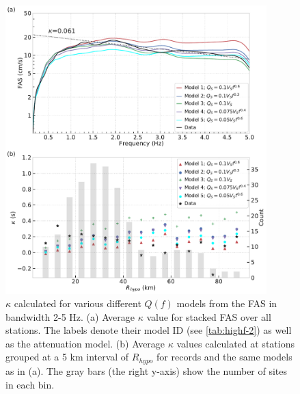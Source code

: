 \begin{figure}[!ht]
  \centering
  \includegraphics[width=0.9\textwidth,height=0.9\textheight,keepaspectratio]{figures/figure_highf_15.pdf}
  \caption{$\kappa$ calculated for various different $Q(f)$ models from the FAS in bandwidth 2-5 Hz. (a) Average $\kappa$ value for stacked FAS over all stations. The labels denote their model ID (see \cref{tab:highf-2}) as well as the attenuation model. (b) Average $\kappa$ values calculated at stations grouped at a 5 km interval of $R_{hypo}$ for records and the same models as in (a). The gray bars (the right y-axis) show the number of sites in each bin.
  }
  \label{fig:highf-15}
\end{figure}
\clearpage



